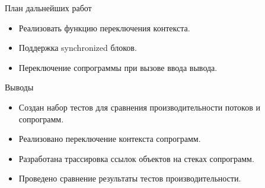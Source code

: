 
\begin{frame}{План дальнейших работ} 
	\begin{itemize}
		\item Реализовать функцию переключения контекста.
		\item Поддержка synchronized блоков.
		\item Переключение сопрограммы при вызове ввода вывода.
	\end{itemize}
\end{frame}

\begin{frame}{Выводы}
	\begin{itemize}
		\item Создан набор тестов для сравнения производительности потоков и сопрограмм.
		\item Реализовано переключение контекста сопрограмм.
		\item Разработана трассировка ссылок объектов на стеках сопрограмм.
		\item Проведено сравнение результаты тестов производительности.
	\end{itemize}
\end{frame}


